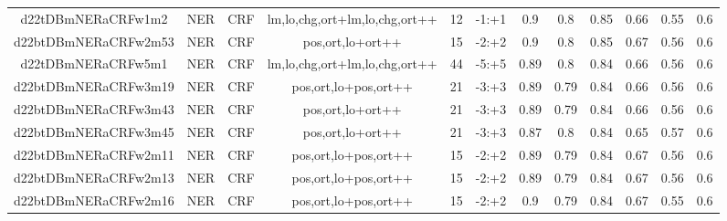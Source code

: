 \documentclass[a4paper]{article}
\begin{document}
\begin{landscape}
\begin{center}
\begin{tabular}{ |c|c|c|c|c|c|c|c|c|c|c|c|}
 	

 
 	
 	\small{ d22tDBmNERaCRFw1m2 } & \small{ NER} & \small{  CRF }  & lm,lo,chg,ort+lm,lo,chg,ort++  &  12 &  \small{  -1:+1 }  &  0.9 & 0.8 & 0.85  &  0.66 & 0.55 & 0.6 \\
 	

 
 	
 	\small{ d22btDBmNERaCRFw2m53 } & \small{ NER} & \small{  CRF }  & pos,ort,lo+ort++  &  15 &  \small{  -2:+2 }  &  0.9 & 0.8 & 0.85  &  0.67 & 0.56 & 0.6 \\
 	

 
 	
 	\small{ d22tDBmNERaCRFw5m1 } & \small{ NER} & \small{  CRF }  & lm,lo,chg,ort+lm,lo,chg,ort++  &  44 &  \small{  -5:+5 }  &  0.89 & 0.8 & 0.84  &  0.66 & 0.56 & 0.6 \\
 	

 
 	
 	\small{ d22btDBmNERaCRFw3m19 } & \small{ NER} & \small{  CRF }  & pos,ort,lo+pos,ort++  &  21 &  \small{  -3:+3 }  &  0.89 & 0.79 & 0.84  &  0.66 & 0.56 & 0.6 \\
 	

 
 	
 	\small{ d22btDBmNERaCRFw3m43 } & \small{ NER} & \small{  CRF }  & pos,ort,lo+ort++  &  21 &  \small{  -3:+3 }  &  0.89 & 0.79 & 0.84  &  0.66 & 0.56 & 0.6 \\
 	

 
 	
 	\small{ d22btDBmNERaCRFw3m45 } & \small{ NER} & \small{  CRF }  & pos,ort,lo+ort++  &  21 &  \small{  -3:+3 }  &  0.87 & 0.8 & 0.84  &  0.65 & 0.57 & 0.6 \\
 	

 
 	
 	\small{ d22btDBmNERaCRFw2m11 } & \small{ NER} & \small{  CRF }  & pos,ort,lo+pos,ort++  &  15 &  \small{  -2:+2 }  &  0.89 & 0.79 & 0.84  &  0.67 & 0.56 & 0.6 \\
 	

 
 	
 	\small{ d22btDBmNERaCRFw2m13 } & \small{ NER} & \small{  CRF }  & pos,ort,lo+pos,ort++  &  15 &  \small{  -2:+2 }  &  0.89 & 0.79 & 0.84  &  0.67 & 0.56 & 0.6 \\
 	

 
 	
 	\small{ d22btDBmNERaCRFw2m16 } & \small{ NER} & \small{  CRF }  & pos,ort,lo+pos,ort++  &  15 &  \small{  -2:+2 }  &  0.9 & 0.79 & 0.84  &  0.67 & 0.55 & 0.6 \\
 	


\end{tabular}
\end{center}
\end{landscape}
\end{document}
